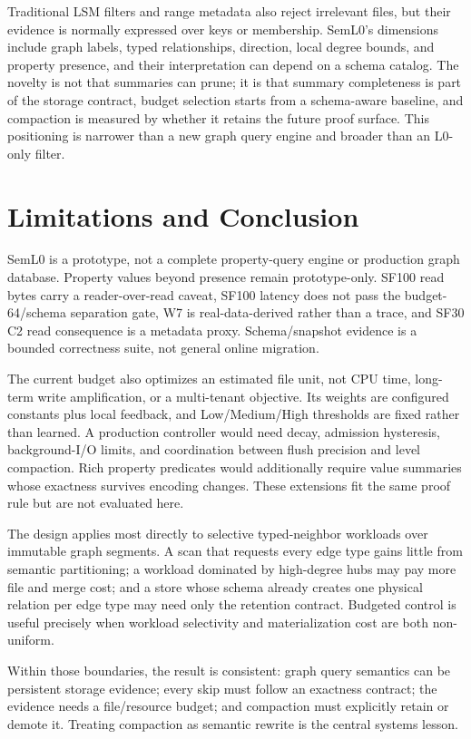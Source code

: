 \documentclass[sigconf,screen]{cidr-2027}
\newcommand{\sys}{SemL0\xspace}
\begin{document}
Traditional LSM filters and range metadata also reject irrelevant files, but
their evidence is normally expressed over keys or membership. SemL0's
dimensions include graph labels, typed relationships, direction, local degree
bounds, and property presence, and their interpretation can depend on a schema
catalog. The novelty is not that summaries can prune; it is that summary
completeness is part of the storage contract, budget selection starts from a
schema-aware baseline, and compaction is measured by whether it retains the
future proof surface. This positioning is narrower than a new graph query
engine and broader than an L0-only filter.

\section{Limitations and Conclusion}

\sys is a prototype, not a complete property-query engine or production graph
database. Property values beyond presence remain prototype-only. SF100 read
bytes carry a reader-over-read caveat, SF100 latency does not pass the
budget-64/schema separation gate, W7 is real-data-derived rather than a trace,
and SF30 C2 read consequence is a metadata proxy. Schema/snapshot evidence is a
bounded correctness suite, not general online migration.

The current budget also optimizes an estimated file unit, not CPU time,
long-term write amplification, or a multi-tenant objective. Its weights are
configured constants plus local feedback, and Low/Medium/High thresholds are
fixed rather than learned. A production controller would need decay, admission
hysteresis, background-I/O limits, and coordination between flush precision
and level compaction. Rich property predicates would additionally require
value summaries whose exactness survives encoding changes. These extensions
fit the same proof rule but are not evaluated here.

The design applies most directly to selective typed-neighbor workloads over
immutable graph segments. A scan that requests every edge type gains little
from semantic partitioning; a workload dominated by high-degree hubs may pay
more file and merge cost; and a store whose schema already creates one physical
relation per edge type may need only the retention contract. Budgeted control
is useful precisely when workload selectivity and materialization cost are
both non-uniform.

Within those boundaries, the result is consistent: graph query semantics can
be persistent storage evidence; every skip must follow an exactness contract;
the evidence needs a file/resource budget; and compaction must explicitly
retain or demote it. Treating compaction as semantic rewrite is the central
systems lesson.
\end{document}
